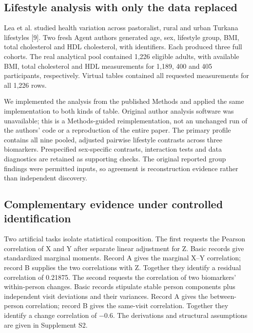 \documentclass[11pt,letterpaper]{article}
\begin{document}
\endgroup

\subsection{Lifestyle analysis with only the data replaced}

Lea et al. studied health variation across pastoralist, rural and urban Turkana lifestyles [9]. Two fresh Agent authors generated age, sex, lifestyle group, BMI, total cholesterol and HDL cholesterol, with identifiers. Each produced three full cohorts. The real analytical pool contained 1,226 eligible adults, with available BMI, total cholesterol and HDL measurements for 1,189, 400 and 405 participants, respectively. Virtual tables contained all requested measurements for all 1,226 rows.


We implemented the analysis from the published Methods and applied the same implementation to both kinds of table. Original author analysis software was unavailable; this is a Methods-guided reimplementation, not an unchanged run of the authors' code or a reproduction of the entire paper. The primary profile contains all nine pooled, adjusted pairwise lifestyle contrasts across three biomarkers. Prespecified sex-specific contrasts, interaction tests and data diagnostics are retained as supporting checks. The original reported group findings were permitted inputs, so agreement is reconstruction evidence rather than independent discovery.


\subsection{Complementary evidence under controlled identification}

Two artificial tasks isolate statistical composition. The first requests the Pearson correlation of X and Y after separate linear adjustment for Z. Basic records give standardized marginal moments. Record A gives the marginal X–\allowbreak{}Y correlation; record B supplies the two correlations with Z. Together they identify a residual correlation of 0.21875. The second requests the correlation of two biomarkers' within-person changes. Basic records stipulate stable person components plus independent visit deviations and their variances. Record A gives the between-person correlation; record B gives the same-visit correlation. Together they identify a change correlation of −0.6. The derivations and structural assumptions are given in Supplement S2.
\end{document}
